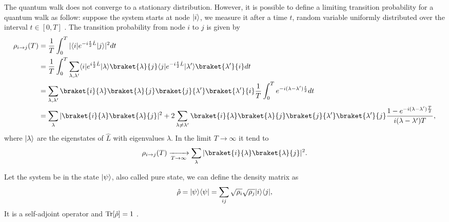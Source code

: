 The quantum walk does not converge to a stationary distribution. 
However, it is possible to define a limiting transition probability for a quantum walk as follow: suppose the system starts at node $\lvert i\rangle$, we measure it after a time $t$, random variable uniformly distributed over the interval $t \in [0,T]$ \cite{quantum_walk}. The transition probability from node $i$ to $j$ is given by
\begin{equation}
    \begin{split}
        \rho_{i\rightarrow j}(T) &= \frac{1}{T}\int_0^T |\bra{i}e^{-i\frac{t}{2}\hat L} \ket{j}|^2 dt\\
        &=\frac{1}{T}\int_0^T \sum_{\lambda,\lambda'}\bra{i}e^{i\frac{t}{2}\hat L}\ket{\lambda}\braket{\lambda}{j} \bra{j}e^{-i\frac{t}{2}\hat L} \ket{\lambda'}\braket{\lambda'}{i} dt\\
        &= \sum_{\lambda,\lambda'}\braket{i}{\lambda}\braket{\lambda}{j}\braket{j}{\lambda'}\braket{\lambda'}{i}\frac{1}{T}\int_0^T e^{-i(\lambda-\lambda')\frac{t}{2}}dt\\
        &= \sum_\lambda|\braket{i}{\lambda}\braket{\lambda}{j}|^2+2\sum_{\lambda\neq\lambda'}\braket{i}{\lambda}\braket{\lambda}{j}\braket{j}{\lambda'}\braket{\lambda'}{j}\frac{1-e^{-i(\lambda-\lambda')\frac{T}{2}}}{i(\lambda-\lambda')T},\\
    \end{split}
\end{equation}
where $\lvert\lambda\rangle$ are the eigenstates of $\hat L$ with eigenvalues $\lambda$. In the limit $T\rightarrow \infty$ it tend to 
\begin{equation}
    \rho_{i\rightarrow j}(T) \xrightarrow[T \rightarrow \infty]{} \sum_\lambda|\braket{i}{\lambda}\braket{\lambda}{j}|^2.
\end{equation}

Let the system be in the state $\lvert\psi\rangle$, also called pure state, we can define the density matrix as
\begin{equation}
    \hat\rho =\lvert\psi\rangle\langle\psi\rvert = \sum_{ij} \sqrt{\rho_i} \sqrt{\rho_j}\lvert i\rangle\langle j\rvert,
\end{equation}
It is a self-adjoint operator and $\operatorname{Tr}[\hat\rho] = 1$ .

